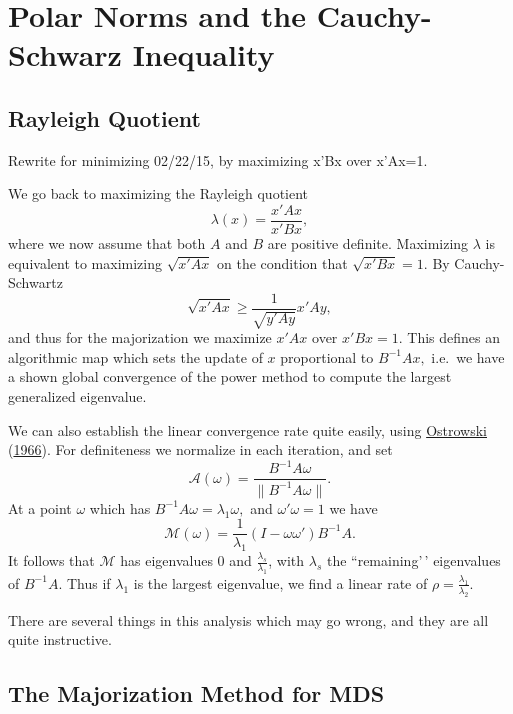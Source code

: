\documentclass[
  12pt,
]{book}
\begin{document}
\hypertarget{polar-norms-and-the-cauchy-schwarz-inequality}{%
\section{Polar Norms and the Cauchy-Schwarz Inequality}\label{polar-norms-and-the-cauchy-schwarz-inequality}}

\hypertarget{rayleigh-quotient}{%
\subsection{Rayleigh Quotient}\label{rayleigh-quotient}}

Rewrite for minimizing 02/22/15, by maximizing x'Bx over x'Ax=1.

We go back to maximizing the Rayleigh quotient
\[
\lambda(x)=\frac{x'Ax}{x'Bx},
\]
where we now assume that both \(A\) and \(B\) are
positive definite.
Maximizing \(\lambda\)
is equivalent to
maximizing \(\sqrt{x'Ax}\)
on the condition that \(\sqrt{x'Bx}=1\). By
Cauchy-Schwartz
\[
\sqrt{x'Ax}\geq\frac{1}{\sqrt{y'Ay}}x'Ay,
\]
and thus for the majorization we maximize \(x'Ax\) over \(x'Bx=1.\) This defines an algorithmic
map which sets the update of \(x\) proportional
to \(B^{-1}Ax,\) i.e.~we have a shown global
convergence of the power method to compute the
largest generalized eigenvalue.

We can also establish the linear convergence rate
quite easily, using \protect\hyperlink{ref-ostrowski_66}{Ostrowski} (\protect\hyperlink{ref-ostrowski_66}{1966}). For definiteness
we normalize in each iteration, and set
\[
\mathcal{A}(\omega)=\frac{B^{-1}A\omega}{\|B^{-1}A\omega\|}.
\]
At a point \(\omega\) which
has \(B^{-1}A\omega=\lambda_1\omega,\)
and \(\omega'\omega=1\) we have
\[
\mathcal{M}(\omega)=\frac{1}{\lambda_1}(I-\omega\omega')B^{-1}A.
\]
It follows that \(\mathcal{M}\) has eigenvalues \(0\)
and \(\frac{\lambda_s}{\lambda_1}\),
with \(\lambda_s\) the ``remaining'\,' eigenvalues of \(B^{-1}A.\)
Thus if \(\lambda_1\) is the largest eigenvalue, we find a linear
rate of \(\rho=\frac{\lambda_1}{\lambda_2}.\)

There are several things in this analysis which may go wrong, and they are all quite instructive.

\hypertarget{the-majorization-method-for-mds}{%
\subsection{The Majorization Method for MDS}\label{the-majorization-method-for-mds}}
\end{document}
